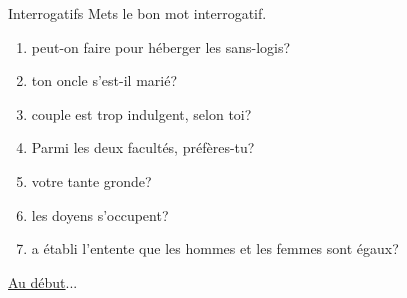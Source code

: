 \begin{frame}{Interrogatifs}
  Mets le bon mot interrogatif.
  \begin{enumerate}
    \item \underline{} peut-on faire pour héberger les sans-logis?
    \item \underline{} ton oncle s'est-il marié?
    \item \underline{} couple est trop indulgent, selon toi?
    \item Parmi les deux facultés, \underline{} préfères-tu?
    \item \underline{} votre tante gronde?
    \item \underline{} les doyens s'occupent?
    \item \underline{} a établi l'entente que les hommes et les femmes sont égaux?
  \end{enumerate}
  \vspace{0.25cm}
  \raggedleft\raggedleft\hyperlink{début}{Au début}...
\end{frame}